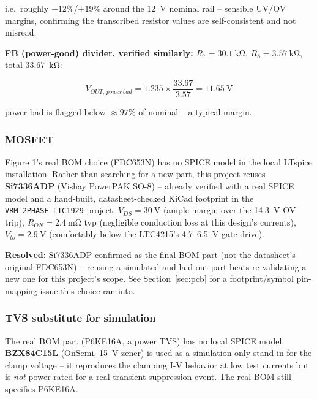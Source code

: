 \documentclass[11pt,letterpaper]{article}
\begin{document}
\noindent i.e.\ roughly $-12\%$/$+19\%$ around the \SI{12}{\volt} nominal rail -- sensible UV/OV margins,
confirming the transcribed resistor values are self-consistent and not misread.

\textbf{FB (power-good) divider, verified similarly:} $R_7=\SI{30.1}{\kilo\ohm}$,
$R_8=\SI{3.57}{\kilo\ohm}$, total \SI{33.67}{\kilo\ohm}:

\begin{equation}
V_{OUT,\,power\,bad} = 1.235\times\frac{33.67}{3.57} = \boxed{\SI{11.65}{\volt}}
\end{equation}

\noindent power-bad is flagged below $\approx97\%$ of nominal -- a typical margin.

\subsubsection{MOSFET}
\label{sec:mosfet}

Figure 1's real BOM choice (FDC653N) has no SPICE model in the local LTspice installation. Rather than
searching for a new part, this project reuses \textbf{Si7336ADP} (Vishay PowerPAK SO-8) -- already verified
with a real SPICE model and a hand-built, datasheet-checked KiCad footprint in the
\texttt{VRM\_2PHASE\_LTC1929} project. $V_{DS}=\SI{30}{\volt}$ (ample margin over the \SI{14.3}{\volt} OV
trip), $R_{ON}=\SI{2.4}{\milli\ohm}$ typ (negligible conduction loss at this design's currents),
$V_{to}=\SI{2.9}{\volt}$ (comfortably below the LTC4215's \SI{4.7}{}--\SI{6.5}{\volt} gate drive).

\textbf{Resolved:} Si7336ADP confirmed as the final BOM part (not the datasheet's original FDC653N) --
reusing a simulated-and-laid-out part beats re-validating a new one for this project's scope. See
Section~\ref{sec:pcb} for a footprint/symbol pin-mapping issue this choice ran into.

\subsubsection{TVS substitute for simulation}
\label{sec:tvs}

The real BOM part (P6KE16A, a power TVS) has no local SPICE model. \textbf{BZX84C15L} (OnSemi,
\SI{15}{\volt} zener) is used as a simulation-only stand-in for the clamp voltage -- it reproduces the
clamping I-V behavior at low test currents but is \emph{not} power-rated for a real transient-suppression
event. The real BOM still specifies P6KE16A.
\end{document}

